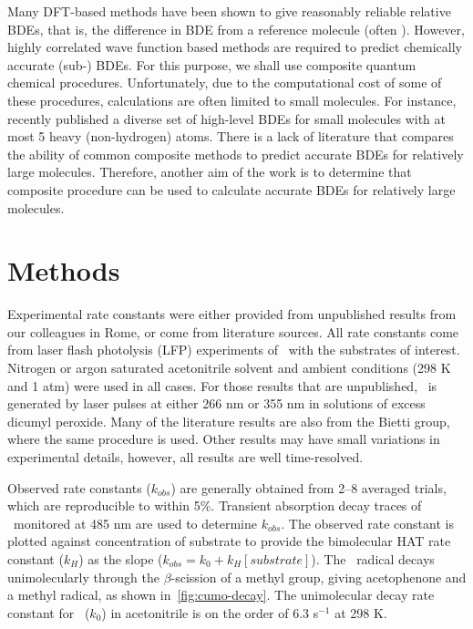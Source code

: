 Many DFT-based methods have been shown to give reasonably reliable relative
BDEs, that is, the difference in BDE from a reference molecule (often
).\cite{DiLabio1999, Chan2012, Wiberg2014} However, highly correlated
wave function based methods are required to predict chemically accurate
(sub-\kcalmol) BDEs. For this purpose, we shall use composite quantum chemical
procedures. Unfortunately, due to the computational cost of some of these
procedures, calculations are often limited to small molecules. For instance,
\citet{Chan2012} recently published a diverse set of high-level BDEs for small
molecules with at most 5 heavy (non-hydrogen) atoms. There is a lack of
literature that compares the ability of common composite methods to predict
accurate  BDEs for relatively large molecules. Therefore, another aim
of the work is to determine that composite procedure can be used to calculate
accurate BDEs for relatively large molecules.

\section{Methods}\label{sec:hat-methods}

Experimental rate constants were either provided from unpublished results from
our colleagues in Rome, or come from literature sources.\cite{Bietti2010,
Bietti2011, Pischel2001, Salamone2011, Salamone2012, Salamone2012a,
Salamone2013, Salamone2015} All rate constants come from laser flash photolysis
(LFP) experiments of \cumo\ with the substrates of interest. Nitrogen or argon
saturated acetonitrile solvent and ambient conditions (298 K and 1 atm) were
used in all cases. For those results that are unpublished, \cumo\ is generated
by laser pulses at either 266 nm or 355 nm in solutions of excess dicumyl
peroxide. Many of the literature results are also from the Bietti group, where
the same procedure is used. Other results may have small variations in
experimental details, however, all results are well time-resolved.

Observed rate constants ($k_{obs}$) are generally obtained from 2--8 averaged
trials, which are reproducible to within 5\%. Transient absorption decay traces
of \cumo\ monitored at 485 nm are used to determine $k_{obs}$. The observed
rate constant is plotted against concentration of substrate to provide the
bimolecular HAT rate constant ($k_H$) as the slope ($k_{obs} = k_0 +
k_H[substrate]$). The \cumo\ radical decays unimolecularly through the
$\beta$-scission of a methyl group, giving acetophenone and a methyl radical,
as shown in~\ref{fig:cumo-decay}. The unimolecular decay rate
constant\cite{Avila1993, Avila1995} for \cumo\ ($k_0$) in acetonitrile is on
the order of 6.3  s$^{-1}$ at 298 K.

